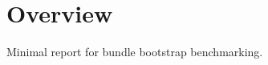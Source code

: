 \documentclass{report}
\begin{document}
\chapter{Overview}
Minimal report for bundle bootstrap benchmarking.
\end{document}
